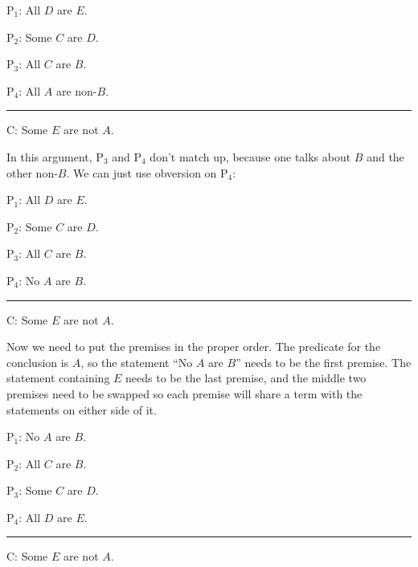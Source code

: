 {\begin{earg}
\item[P$_1$:] All $D$ are $E$.
\item[P$_2$:] Some $C$ are $D$.
\item[P$_3$:] All $C$ are $B$.  
\item[P$_4$:] All $A$ are non-$B$.
\vspace{-.5em}
\item [] \rule{0.2\linewidth}{.5pt} 
\item[C:] Some $E$ are not $A$.    
\end{earg} 

In this argument, P$_3$ and P$_4$ don't match up, because one talks about $B$ and the other non-$B$. We can just use obversion on P$_4$:  

\begin{earg}
\item[P$_1$:] All $D$ are $E$.
\item[P$_2$:] Some $C$ are $D$.
\item[P$_3$:] All $C$ are $B$.  
\item[P$_4$:] No $A$ are $B$.
\vspace{-.5em}
\item [] \rule{0.2\linewidth}{.5pt} 
\item[C:] Some $E$ are not $A$.    
\end{earg} 

Now we need to put the premises in the proper order. The predicate for the conclusion is $A$, so the statement ``No $A$ are $B$'' needs to be the first premise. The statement containing $E$ needs to be the last premise, and the middle two premises need to be swapped so each premise will share a term with the statements on either side of it.

\begin{earg}
\item[P$_1$:] No $A$ are $B$.
\item[P$_2$:] All $C$ are $B$. %
\item[P$_3$:] Some $C$ are $D$.  %
\item[P$_4$:] All $D$ are $E$.
\vspace{-.5em}
\item [] \rule{0.2\linewidth}{.5pt} 
\item[C:] Some $E$ are not $A$.  %
\end{earg} 
\label{standard_forms_sorites_1}

}
